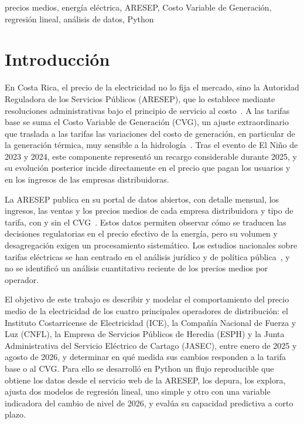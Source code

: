 \documentclass[conference]{IEEEtran}
\begin{document}
\begin{IEEEkeywords}
precios medios, energ\'ia el\'ectrica, ARESEP, Costo Variable de Generaci\'on, regresi\'on lineal, an\'alisis de datos, Python
\end{IEEEkeywords}



\section{Introducci\'on}
\label{sec:intro}

En Costa Rica, el precio de la electricidad no lo fija el mercado, sino la Autoridad Reguladora de los Servicios P\'ublicos (ARESEP), que lo establece mediante resoluciones administrativas bajo el principio de servicio al costo~\cite{r3}. A las tarifas base se suma el Costo Variable de Generaci\'on (CVG), un ajuste extraordinario que traslada a las tarifas las variaciones del costo de generaci\'on, en particular de la generaci\'on t\'ermica, muy sensible a la hidrolog\'ia~\cite{r2}. Tras el evento de El Ni\~no de 2023 y 2024, este componente represent\'o un recargo considerable durante 2025, y su evoluci\'on posterior incide directamente en el precio que pagan los usuarios y en los ingresos de las empresas distribuidoras.

La ARESEP publica en su portal de datos abiertos, con detalle mensual, los ingresos, las ventas y los precios medios de cada empresa distribuidora y tipo de tarifa, con y sin el CVG~\cite{r6}. Estos datos permiten observar c\'omo se traducen las decisiones regulatorias en el precio efectivo de la energ\'ia, pero su volumen y desagregaci\'on exigen un procesamiento sistem\'atico. Los estudios nacionales sobre tarifas el\'ectricas se han centrado en el an\'alisis jur\'idico y de pol\'itica p\'ublica~\cite{r9}, y no se identific\'o un an\'alisis cuantitativo reciente de los precios medios por operador.

El objetivo de este trabajo es describir y modelar el comportamiento del precio medio de la electricidad de los cuatro principales operadores de distribuci\'on: el Instituto Costarricense de Electricidad (ICE), la Compa\~n\'ia Nacional de Fuerza y Luz (CNFL), la Empresa de Servicios P\'ublicos de Heredia (ESPH) y la Junta Administrativa del Servicio El\'ectrico de Cartago (JASEC), entre enero de 2025 y agosto de 2026, y determinar en qu\'e medida sus cambios responden a la tarifa base o al CVG. Para ello se desarroll\'o en Python un flujo reproducible que obtiene los datos desde el servicio web de la ARESEP, los depura, los explora, ajusta dos modelos de regresi\'on lineal, uno simple y otro con una variable indicadora del cambio de nivel de 2026, y eval\'ua su capacidad predictiva a corto plazo.
\end{document}
